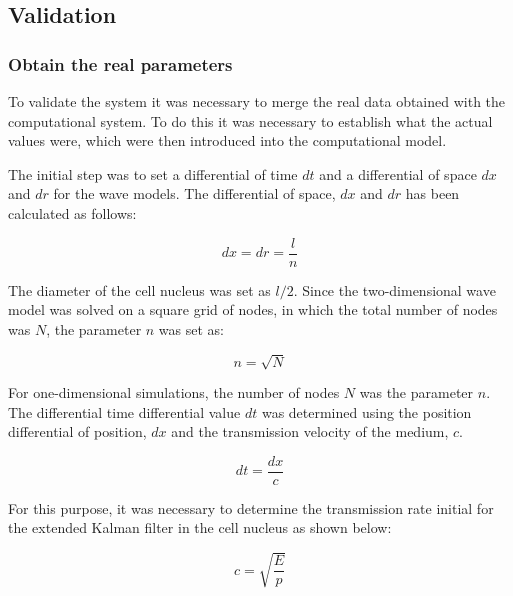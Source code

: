 \documentclass[12pt, a4paper]{article} %
\begin{document}
\subsection{Validation}

\subsubsection{Obtain the real parameters}

To validate the system it was necessary to merge the real data obtained with the computational system. To do this it was necessary to establish what the actual values were, which were then introduced into the computational model.

\setlength{\parskip}{4mm}

The initial step was to set a differential of time $dt$ and a differential of space $dx$ and $dr$ for the wave models. The differential of space, $dx$ and $dr$ has been calculated as follows:

\begin{equation} \label{eqn:dx}
	dx = dr = \frac{l}{n}
\end{equation}

The diameter of the cell nucleus was set as $l/2$. Since the two-dimensional wave model was solved on a square grid of nodes, in which the total number of nodes was $N$, the parameter $n$ was set as:

\begin{equation} \label{eqn:n}
	n = \sqrt{N}
\end{equation}

For one-dimensional simulations, the number of nodes $N$ was the parameter $n$. The differential time differential value $dt$ was determined using the position differential of position, $dx$ and the transmission velocity of the medium, $c$.

\begin{equation} \label{eqn:dt}
	dt = \frac{dx}{c}
\end{equation}

For this purpose, it was necessary to determine the transmission rate initial for the extended Kalman filter in the cell nucleus as shown below:

\begin{equation} \label{eqn:c}
	c = \sqrt{\frac{E}{p}}
\end{equation}
\end{document}
